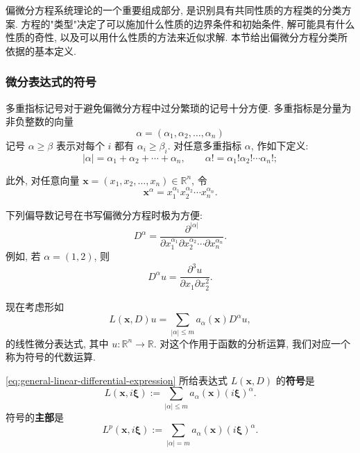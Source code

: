 偏微分方程系统理论的一个重要组成部分, 是识别具有共同性质的方程类的分类方案. 方程的"类型"决定了可以施加什么性质的边界条件和初始条件, 解可能具有什么性质的奇性, 以及可以用什么性质的方法来近似求解. 本节给出偏微分方程分类所依据的基本定义.

\subsubsection{微分表达式的符号}\label{subsec:differential-symbol}

多重指标记号对于避免偏微分方程中过分繁琐的记号十分方便. 多重指标是分量为非负整数的向量
\[
\alpha=(\alpha_1,\alpha_2,\ldots,\alpha_n)
\]
记号 $\alpha\geq\beta$ 表示对每个 $i$ 都有 $\alpha_i\geq\beta_i$. 对任意多重指标 $\alpha$, 作如下定义:
\begin{equation}\label{eq:multi-index-length-factorial}
|\alpha|=\alpha_1+\alpha_2+\cdots+\alpha_n,\qquad \alpha!=\alpha_1!\alpha_2!\cdots\alpha_n!;
\end{equation}


此外, 对任意向量 $\bm{x}=(x_1,x_2,\ldots,x_n)\in\mathbb{R}^n$, 令
\begin{equation}\label{eq:multi-index-monomial}
\bm{x}^{\alpha}=x_1^{\alpha_1}x_2^{\alpha_2}\cdots x_n^{\alpha_n}.
\end{equation}


下列偏导数记号在书写偏微分方程时极为方便:
\begin{equation}\label{eq:multi-index-derivative}
D^{\alpha}=\dfrac{\partial^{|\alpha|}}{\partial x_1^{\alpha_1}\partial x_2^{\alpha_2}\cdots\partial x_n^{\alpha_n}}.
\end{equation}
例如, 若 $\alpha=(1,2)$, 则
\begin{equation}\label{eq:multi-index-example}
D^{\alpha}u=\dfrac{\partial^3u}{\partial x_1\partial x_2^2}.
\end{equation}


现在考虑形如
\begin{equation}\label{eq:general-linear-differential-expression}
L(\bm{x},D)u=\sum_{|\alpha|\leq m}a_{\alpha}(\bm{x})D^{\alpha}u,
\end{equation}
的线性微分表达式, 其中 $u:\mathbb{R}^n\to\mathbb{R}$. 对这个作用于函数的分析运算, 我们对应一个称为符号的代数运算.

\begin{Definition}
\label{def:differential-symbol}
\eqref{eq:general-linear-differential-expression} 所给表达式 $L(\bm{x},D)$ 的\textbf{符号}是
\begin{equation}\label{eq:differential-symbol}
L(\bm{x},i\bm{\xi}):=\sum_{|\alpha|\leq m}a_{\alpha}(\bm{x})(i\bm{\xi})^{\alpha}.
\end{equation}
符号的\textbf{主部}是
\begin{equation}\label{eq:principal-symbol}
L^p(\bm{x},i\bm{\xi}):=\sum_{|\alpha|=m}a_{\alpha}(\bm{x})(i\bm{\xi})^{\alpha}.
\end{equation}

\end{Definition}

